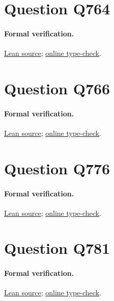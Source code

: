 \documentclass[11pt]{article}
\begin{document}
\section{Question Q764}

\paragraph{Formal verification.}
\href{https://github.com/l-pommeret/rms-math-proofs/blob/e762c85785f3ed049ea364aed5aee75297bdcd81/lean/RMS/Q764Complete.lean}{Lean source}; \href{https://github.com/l-pommeret/rms-math-proofs/actions/runs/31315978168}{online type-check}.

\section{Question Q766}

\paragraph{Formal verification.}
\href{https://github.com/l-pommeret/rms-math-proofs/blob/b123be4957f53e8584a77d7dc13efb23ba021b52/lean/RMS/Q766Canonical.lean}{Lean source}; \href{https://github.com/l-pommeret/rms-math-proofs/actions/runs/31313457464}{online type-check}.

\section{Question Q776}

\paragraph{Formal verification.}
\href{https://github.com/l-pommeret/rms-math-proofs/blob/eba21d414d58a04f9efd68183b69c958b53d2c43/lean/RMS/Q776Main.lean}{Lean source}; \href{https://github.com/l-pommeret/rms-math-proofs/actions/runs/31320958254}{online type-check}.

\section{Question Q781}

\paragraph{Formal verification.}
\href{https://github.com/l-pommeret/rms-math-proofs/blob/e3955b96dac273c9bc03717e9cc8c73239453bf4/lean/RMS/Q781.lean}{Lean source}; \href{https://github.com/l-pommeret/rms-math-proofs/actions/runs/31286132535}{online type-check}.
\end{document}
